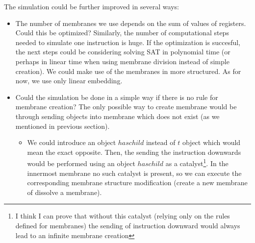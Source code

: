 \documentclass[llncs,submission,copyright,creativecommons]{../lib/lncs/llncs}
\begin{document}
The simulation could be further improved in several ways:
\begin{itemize}
  \item The number of membranes we use depends on the sum of values of registers. Could this be optimized? Similarly, the number of computational steps needed to simulate one instruction is huge. If the optimization is succesful, the next steps could be considering solving SAT in polynomial time (or perhaps in linear time when using membrane division instead of simple creation). We could make use of the membranes in more structured. As for now, we use only linear embedding.
  \item Could the simulation be done in a simple way if there is no rule for membrane creation? The only possible way to create membrane would be through sending objects into membrane which does not exist (as we mentioned in previous section).
  \begin{itemize}
    \item We could introduce an object $haschild$ instead of $t$ object which would mean the exact opposite. Then, the sending the instruction downwards would be performed using an object $haschild$ as a catalyst\footnote{I think I can prove that without this catalyst (relying only on the rules defined for membranes) the sending of instruction downward would always lead to an infinite membrane creation}. In the innermost membrane no such catalyst is present, so we can execute the corresponding membrane structure modification (create a new membrane of dissolve a membrane).
  \end{itemize}
\end{itemize}




\end{document}
